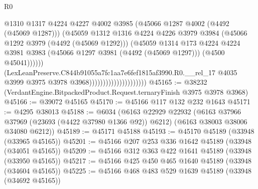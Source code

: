 \begin{lexlean}{R0}
\begin{coremodule}
                                                  @1310
                                                  @1317
                                                  @4224
                                                  @4227
                                                  @4002
                                                  @3985
                                                  (@45066 @1287 @4002 (@4492 (@45069 @1287)))
                                                  (@45059
                                                    @1312
                                                    @1316
                                                    @4224
                                                    @4226
                                                    @3979
                                                    @3984
                                                    (@45066 @1292 @3979 (@4492 (@45069 @1292)))
                                                    (@45059
                                                      @1314
                                                      @173
                                                      @4224
                                                      @4224
                                                      @3981
                                                      @3983
                                                      (@45066 @1297 @3981 (@4492 (@45069 @1297)))
                                                      (@4500 @45041))))))
                                            (LexLeanPreserve.C844b91055a7fc1aa7e6fef1815af3990.R0.__rel_17
                                              @4035
                                              @3999
                                              @3975
                                              @3978
                                              @3968)))))))))))))))))))))
@45165 := @38232 (VerdantEngine.BitpackedProduct.Request.ternaryFinish @3975 @3978 @3968)
@45166 := @39072 @45165
@45170 := @45166 @117 @132 @232 @1643
@45171 := @4295 @38013
@45188 := @6034
    (@6163
      @22929
      @22932
      (@6163 @37966 @37969 (@23693 (@4422 @37980 @1366 @92)) @6212)
      (@6163 @38003 @38006 @34080 @6212))
@45189 := @45171 @45188
@45193 := @45170 @45189 (@33948 (@33965 @45165))
@45201 := @45166 @207 @253 @336 @1642 @45189 (@33948 (@34051 @45165))
@45209 := @45166 @312 @363 @422 @1641 @45189 (@33948 (@33950 @45165))
@45217 := @45166 @425 @450 @465 @1640 @45189 (@33948 (@34604 @45165))
@45225 := @45166 @468 @483 @529 @1639 @45189 (@33948 (@34692 @45165))

\end{coremodule}
\end{lexlean}
